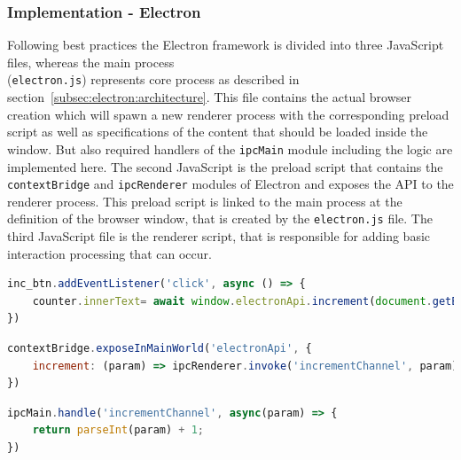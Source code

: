 \subsubsection{Implementation - Electron}
\label{subsubsec:impl:electron}
Following best practices the Electron framework is divided into three JavaScript files, whereas the main process \\(\texttt{electron.js}) represents core process as described in section~\ref{subsec:electron:architecture}.
This file contains the actual browser creation which will spawn a new renderer process  with the corresponding preload script as well as specifications of the content that should be loaded inside the window.
But also required handlers of the \texttt{ipcMain} module including the logic are implemented here.
The second JavaScript is the preload script that contains the \texttt{contextBridge}  and \texttt{ipcRenderer} modules of Electron and exposes the API to the renderer process.
This preload script is linked to the main process at the definition of the browser window, that is created by the \texttt{electron.js} file.
The third JavaScript file is the renderer script, that is responsible for adding basic interaction processing that can occur.

\begin{lstlisting}[language=JavaScript,label={lst:rendererjs}, caption={Excerpt of render.js}]
inc_btn.addEventListener('click', async () => {
    counter.innerText= await window.electronApi.increment(document.getElementById('counter').innerText)
})
\end{lstlisting}
\begin{lstlisting}[language=JavaScript,label={lst:preloadjs}, caption={Excerpt of preload.js}]
contextBridge.exposeInMainWorld('electronApi', {
    increment: (param) => ipcRenderer.invoke('incrementChannel', param)
})
\end{lstlisting}
\begin{lstlisting}[language=JavaScript,label={lst:electronjs}, caption={Excerpt of electron.js}]
ipcMain.handle('incrementChannel', async(param) => {
    return parseInt(param) + 1;
})
\end{lstlisting}


